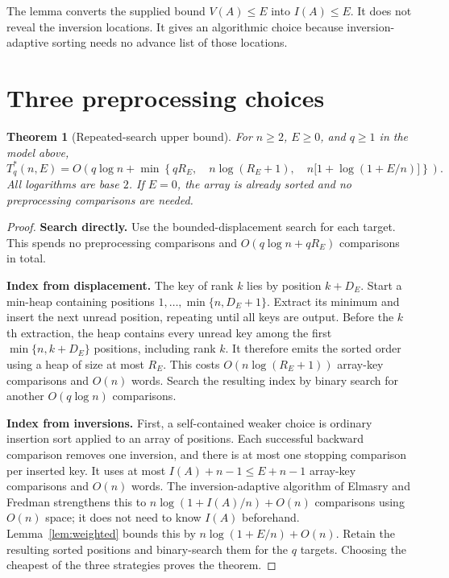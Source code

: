 \documentclass[10pt,letterpaper]{article}
\newtheorem{theorem}{Theorem}
\begin{document}
The lemma converts the supplied bound $V(A)\le E$ into $I(A)\le E$.
It does not reveal the inversion locations. It gives an algorithmic
choice because inversion-adaptive sorting needs no advance list of
those locations.

\section{Three preprocessing choices}
\begin{theorem}[Repeated-search upper bound]\label{thm:three}
For $n\ge2$, $E\ge0$, and $q\ge1$ in the model above,
\[
 \boxed{\displaystyle
 T_q^*(n,E)=O\!\left(
 q\log n+\min\left\{
 qR_E,\quad n\log(R_E+1),\quad
 n\bigl[1+\log(1+E/n)\bigr]
 \right\}\right).}
\]
All logarithms are base $2$. If $E=0$, the array is already sorted
and no preprocessing comparisons are needed.
\end{theorem}
\begin{proof}
\textbf{Search directly.} Use the bounded-displacement search for
each target. This spends no preprocessing comparisons and
$O(q\log n+qR_E)$ comparisons in total.

\textbf{Index from displacement.} The key of rank $k$ lies by
position $k+D_E$. Start a min-heap containing positions
$1,\ldots,\min\{n,D_E+1\}$. Extract its minimum and insert the next
unread position, repeating until all keys are output. Before the
$k$th extraction, the heap contains every unread key among the first
$\min\{n,k+D_E\}$ positions, including rank $k$. It therefore emits
the sorted order using a heap of size at most $R_E$. This costs
$O(n\log(R_E+1))$ array-key comparisons and $O(n)$ words. Search the
resulting index by binary search for another $O(q\log n)$ comparisons.

\textbf{Index from inversions.} First, a self-contained weaker choice
is ordinary insertion sort applied to an array of positions. Each
successful backward comparison removes one inversion, and there is
at most one stopping comparison per inserted key. It uses at most
$I(A)+n-1\le E+n-1$ array-key comparisons and $O(n)$ words. The
inversion-adaptive algorithm of Elmasry and Fredman
\cite{elmasryfredman} strengthens this to
$n\log(1+I(A)/n)+O(n)$ comparisons using $O(n)$ space; it does not
need to know $I(A)$ beforehand. Lemma~\ref{lem:weighted} bounds this
by $n\log(1+E/n)+O(n)$. Retain the resulting sorted positions and
binary-search them for the $q$ targets. Choosing the cheapest of the
three strategies proves the theorem.
\end{proof}
\end{document}
